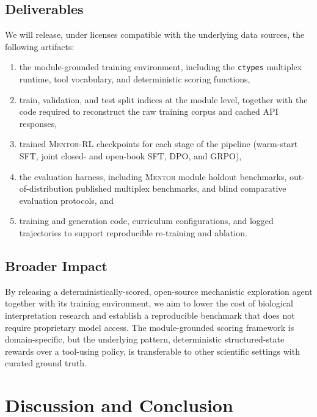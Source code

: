 \documentclass[thesis,letterpaper,12pt]{utthesis}
\begin{document}
\subsection{Deliverables}
We will release, under licenses compatible with the underlying data sources, the following artifacts:
\begin{enumerate}
    \item the module-grounded training environment, including the \texttt{ctypes} multiplex runtime, tool vocabulary, and deterministic scoring functions,
    \item train, validation, and test split indices at the module level, together with the code required to reconstruct the raw training corpus and cached API responses,
    \item trained \textsc{Mentor-RL} checkpoints for each stage of the pipeline (warm-start SFT, joint closed- and open-book SFT, DPO, and GRPO),
    \item the evaluation harness, including \textsc{Mentor} module holdout benchmarks, out-of-distribution published multiplex benchmarks, and blind comparative evaluation protocols, and
    \item training and generation code, curriculum configurations, and logged trajectories to support reproducible re-training and ablation.
\end{enumerate}

\subsection{Broader Impact}
By releasing a deterministically-scored, open-source mechanistic exploration agent together with its training environment, we aim to lower the cost of biological interpretation research and establish a reproducible benchmark that does not require proprietary model access. The module-grounded scoring framework is domain-specific, but the underlying pattern, deterministic structured-state rewards over a tool-using policy, is transferable to other scientific settings with curated ground truth.

\section{Discussion and Conclusion}
\end{document}
